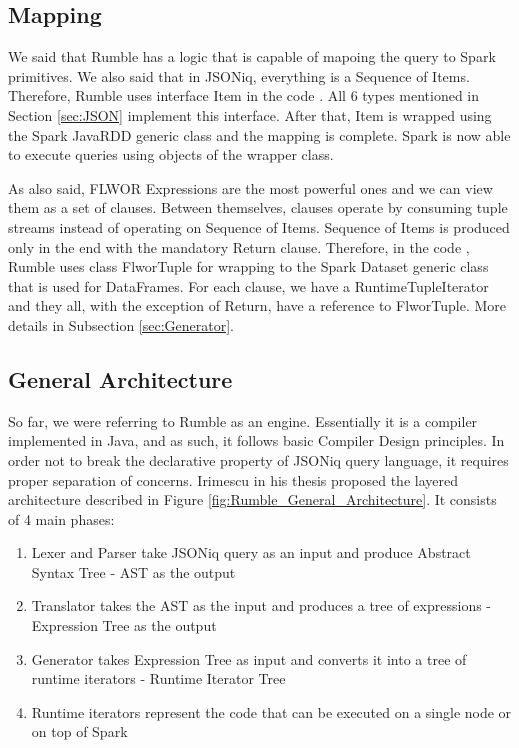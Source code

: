 \subsection{Mapping}
\label{sec:RumbleMapping}
We said that Rumble has a logic that is capable of mapoing the query to Spark primitives. We also said that in JSONiq, everything is a Sequence of Items. Therefore, Rumble uses interface Item in the code \cite{RumbleRepository}. All 6 types mentioned in Section \ref{sec:JSON} implement this interface. After that, Item is wrapped using the Spark JavaRDD generic class and the mapping is complete. Spark is now able to execute queries using objects of the wrapper class.

As also said, FLWOR Expressions are the most powerful ones and we can view them as a set of clauses. Between themselves, clauses operate by consuming tuple streams instead of operating on Sequence of Items. Sequence of Items is produced only in the end with the mandatory Return clause. Therefore, in the code \cite{RumbleRepository}, Rumble uses class FlworTuple for wrapping to the Spark Dataset generic class that is used for DataFrames. For each clause, we have a RuntimeTupleIterator and they all, with the exception of Return, have a reference to FlworTuple. More details in Subsection \ref{sec:Generator}.

\subsection{General Architecture}
\label{sec:RumbleArchitecture}
So far, we were referring to Rumble as an engine. Essentially it is a compiler implemented in Java, and as such, it follows basic Compiler Design principles. In order not to break the declarative property of JSONiq query language, it requires proper separation of concerns. Irimescu in his thesis \cite{RumbleThesis} proposed the layered architecture described in Figure \ref{fig:Rumble_General_Architecture}. It consists of 4 main phases:
\begin{enumerate}
	\item Lexer and Parser take JSONiq query as an input and produce Abstract Syntax Tree - AST as the output 
	\item Translator takes the AST as the input and produces a tree of expressions - Expression Tree as the output
	\item Generator takes Expression Tree as input and converts it into a tree of runtime iterators - Runtime Iterator Tree
	\item Runtime iterators represent the code that can be executed on a single node or on top of Spark
\end{enumerate} 

